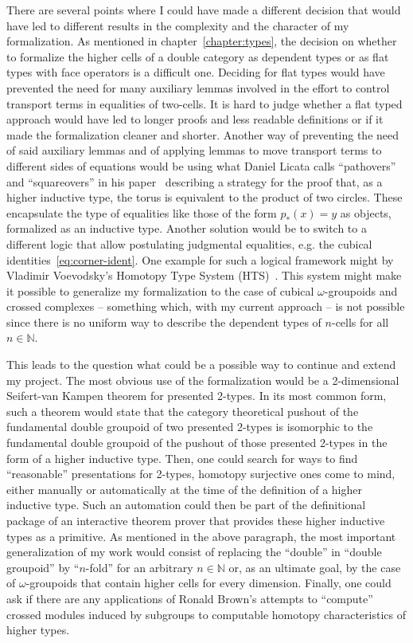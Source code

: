 There are several points where I could have made a different decision that would
have led to different results in the complexity and the character of my formalization.
As mentioned in chapter~\ref{chapter:types}, the decision on whether to formalize
the higher cells of a double category as dependent types or as flat types with
face operators is a difficult one.
Deciding for flat types would have prevented the need for many auxiliary lemmas
involved in the effort to control transport terms in equalities of two-cells.
It is hard to judge whether a flat typed approach would have led to longer proofs
and less readable definitions or if it made the formalization cleaner and shorter.
Another way of preventing the need of said auxiliary lemmas and of applying lemmas
to move transport terms to different sides of equations would be using what Daniel
Licata calls ``pathovers'' and ``squareovers'' in his paper~\cite{licatacubical}
describing a strategy for the proof that, as a higher inductive type, the torus
is equivalent to the product of two circles.
These encapsulate the type of equalities like those of the form $p_*(x) = y$ as objects,
formalized as an inductive type. %
Another solution would be to switch to a different logic that allow postulating
judgmental equalities, e.g. the cubical identities~\ref{eq:corner-ident}.
One example for such a logical framework might by Vladimir Voevodsky's
Homotopy Type System (HTS)~\cite{hts}.
This system might make it possible to generalize my formalization to the case
of cubical $\omega$-groupoids and crossed complexes -- something which, with my
current approach -- is not possible since there is no uniform way to describe the
dependent types of $n$-cells for all $n \in \mathbb{N}$.

This leads to the question what could be a possible way to continue and extend
my project.
The most obvious use of the formalization would be a 2-dimensional Seifert-van
Kampen theorem for presented 2-types.
In its most common form, such a theorem would state that the category
theoretical pushout of the fundamental double groupoid of two presented 2-types
is isomorphic to the fundamental double groupoid of the pushout of those presented
2-types in the form of a higher inductive type.
Then, one could search for ways to find ``reasonable'' presentations for 2-types,
homotopy surjective ones come to mind, either manually or automatically at the
time of the definition of a higher inductive type.
Such an automation could then be part of the definitional package of an interactive
theorem prover that provides these higher inductive types as a primitive.
As mentioned in the above paragraph, the most important generalization of my work
would consist of replacing the ``double'' in ``double groupoid'' by ``$n$-fold''
for an arbitrary $n \in \mathbb{N}$ or, as an ultimate goal, by the case of
$\omega$-groupoids that contain higher cells for every dimension.
Finally, one could ask if there are any applications of Ronald Brown's attempts
to ``compute'' crossed modules induced by subgroups \cite{brown1996computing}
to computable homotopy characteristics of higher types.




